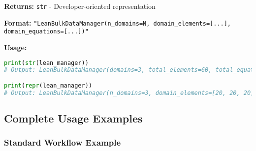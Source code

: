 \textbf{Returns:} \texttt{str} - Developer-oriented representation

\textbf{Format:} \texttt{"LeanBulkDataManager(n\_domains=N, domain\_elements=[...], domain\_equations=[...])"}

\textbf{Usage:}
\begin{lstlisting}[language=Python, caption=String Methods Usage]
print(str(lean_manager))
# Output: LeanBulkDataManager(domains=3, total_elements=60, total_equations=6)

print(repr(lean_manager))
# Output: LeanBulkDataManager(n_domains=3, domain_elements=[20, 20, 20], domain_equations=[2, 2, 2])
\end{lstlisting}

\subsection{Complete Usage Examples}
\label{subsec:complete_usage_examples}

\subsubsection{Standard Workflow Example}

